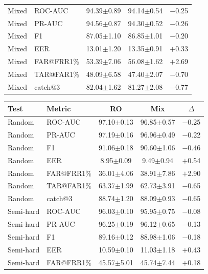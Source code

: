\documentclass[11pt]{article}
\begin{document}
\begin{table}[!t]
\begin{minipage}[t]{0.48\textwidth}
\begin{tabular}{l l c c c}
\midrule
Mixed     & ROC-AUC    & 94.39$\pm$0.89 & 94.14$\pm$0.54 & $-$0.25 \\
Mixed     & PR-AUC     & 94.56$\pm$0.87 & 94.30$\pm$0.52 & $-$0.26 \\
Mixed     & F1         & 87.05$\pm$1.10 & 86.85$\pm$1.01 & $-$0.20 \\
Mixed     & EER        & 13.01$\pm$1.20 & 13.35$\pm$0.91 & $+$0.33 \\
Mixed     & FAR@FRR1\% & 53.39$\pm$7.06 & 56.08$\pm$1.62 & $+$2.69 \\
Mixed     & TAR@FAR1\% & 48.09$\pm$6.58 & 47.40$\pm$2.07 & $-$0.70 \\
Mixed     & catch@3    & 82.04$\pm$1.62 & 81.27$\pm$2.08 & $-$0.77 \\
\bottomrule
\end{tabular}
\label{tab:app_pan_minilm}
\end{minipage}%
\hfill
\begin{minipage}[t]{0.48\textwidth}
\centering
\begin{tabular}{l l c c c}
\toprule
\textbf{Test} & \textbf{Metric} & \textbf{RO} & \textbf{Mix} & \textbf{$\Delta$} \\
\midrule
Random    & ROC-AUC    & 97.10$\pm$0.13 & 96.85$\pm$0.57 & $-$0.25 \\
Random    & PR-AUC     & 97.19$\pm$0.16 & 96.96$\pm$0.49 & $-$0.22 \\
Random    & F1         & 91.06$\pm$0.18 & 90.60$\pm$1.06 & $-$0.46 \\
Random    & EER        & \phantom{0}8.95$\pm$0.09 & \phantom{0}9.49$\pm$0.94 & $+$0.54 \\
Random    & FAR@FRR1\% & 36.01$\pm$4.06 & 38.91$\pm$7.86 & $+$2.90 \\
Random    & TAR@FAR1\% & 63.37$\pm$1.99 & 62.73$\pm$3.91 & $-$0.65 \\
Random    & catch@3    & 88.74$\pm$1.20 & 88.09$\pm$0.93 & $-$0.65 \\
\midrule
Semi-hard & ROC-AUC    & 96.03$\pm$0.10 & 95.95$\pm$0.75 & $-$0.08 \\
Semi-hard & PR-AUC     & 96.25$\pm$0.19 & 96.12$\pm$0.65 & $-$0.13 \\
Semi-hard & F1         & 89.16$\pm$0.12 & 88.98$\pm$1.06 & $-$0.18 \\
Semi-hard & EER        & 10.59$\pm$0.10 & 11.03$\pm$1.18 & $+$0.43 \\
Semi-hard & FAR@FRR1\% & 45.57$\pm$5.01 & 45.74$\pm$7.44 & $+$0.18 \\

\end{tabular}
\end{minipage}
\end{table}
\end{document}
